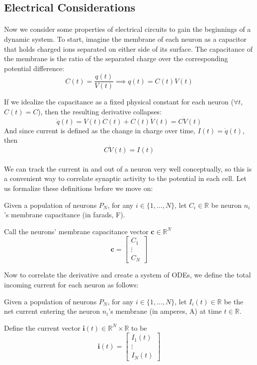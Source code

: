 \documentclass{article}
\begin{document}
\subsection{Electrical Considerations}

\paragraph{}
Now we consider some properties of electrical circuits to gain the beginnings of a dynamic system. To start, imagine the membrane of each neuron as a capacitor that holds charged ions separated on either side of its surface. The capacitance of the membrane is the ratio of the separated charge over the corresponding potential difference:
\[ C(t) = \frac{q(t)}{V(t)} \implies q(t) = C(t)V(t) \]

If we idealize the capacitance as a fixed physical constant for each neuron ($\forall t$, $C(t)=C$), then the resulting derivative collapses:
\[ \dot{q}(t) = V(t)\dot{C}(t) + C(t)\dot{V}(t) = C\dot{V}(t) \]
And since current is defined as the change in charge over time, $I(t) = \dot{q}(t)$, then
\[ C\dot{V}(t) = I(t) \]

\paragraph{}
We can track the current in and out of a neuron very well conceptually, so this is a convenient way to correlate synaptic activity to the potential in each cell. Let us formalize these definitions before we move on:

\begin{definition}[$\mathbf{c} = \textbf{membrane capacitance vector}$]\label{c}
Given a population of neurons $P_{N}$, for any $i \in \{ 1, \dots, N \}$, let $C_{i}\in\mathbb{R}$ be neuron $n_{i}$'s membrane capacitance (in farads, F).

Call the neurons' membrane capacitance vector $\mathbf{c}\in\mathbb{R}^{N}$
\[ \mathbf{c} =
\begin{bmatrix}
C_{1} \\
\vdots \\
C_{N}
\end{bmatrix} \]
\end{definition}

Now to correlate the derivative and create a system of ODEs, we define the total incoming current for each neuron as follows:

\begin{definition}[$\mathbf{i}(t) = \textbf{incoming current vector}$]\label{i}
Given a population of neurons $P_{N}$, for any $i \in \{ 1, \dots, N \}$, let $I_{i}(t)\in\mathbb{R}$ be the net current entering the neuron $n_{i}$'s membrane (in amperes, A) at time $t\in\mathbb{R}$.

Define the current vector $\mathbf{i}(t)\in\mathbb{R}^{N}\times\mathbb{R}$ to be 
\[ \mathbf{i}(t) =
\begin{bmatrix}
I_{1}(t) \\
\vdots \\
I_{N}(t)
\end{bmatrix} \]
\end{definition}
\end{document}
